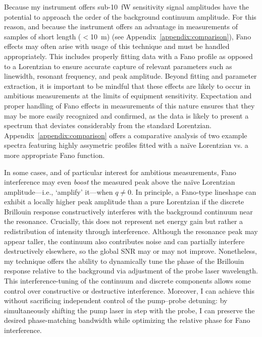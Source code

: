 Because my instrument offers sub-\SI{10}{\femto\watt} sensitivity signal amplitudes have the potential to approach the order of the background continuum amplitude. For this reason, and because the instrument offers an advantage in measurements of samples of short length (\(<\)\SI{10}{m}) (see Appendix~\ref{appendix:comparison}), Fano effects may often arise with usage of this technique and must be handled appropriately. This includes properly fitting data with a Fano profile as opposed to a Lorentzian to ensure accurate capture of relevant parameters such as linewidth, resonant frequency, and peak amplitude. Beyond fitting and parameter extraction, it is important to be mindful that these effects are likely to occur in ambitious measurements at the limits of equipment sensitivity. Expectation and proper handling of Fano effects in measurements of this nature ensures that they may be more easily recognized and confirmed, as the data is likely to present a spectrum that deviates considerably from the standard Lorentzian. Appendix~\ref{appendix:comparison} offers a comparative analysis of two example spectra featuring highly assymetric profiles fitted with a naïve Lorentzian vs. a more appropriate Fano function.

In some cases, and of particular interest for ambitious measurements, Fano interference may even \textit{boost} the measured peak above the naïve Lorentzian amplitude—i.e., ‘amplify’ it—when \(q \neq 0\). In principle, a Fano‐type lineshape can exhibit a locally higher peak amplitude than a pure Lorentzian if the discrete Brillouin response constructively interferes with the background continuum near the resonance. Crucially, this does not represent net energy gain but rather a redistribution of intensity through interference. Although the resonance peak may appear taller, the continuum also contributes noise and can partially interfere destructively elsewhere, so the global \ac{SNR} may or may not improve. Nonetheless, my technique offers the ability to dynamically tune the phase of the Brillouin response relative to the background via adjustment of the probe laser wavelength. This interference-tuning of the continuum and discrete components allows some control over constructive or destructive interference. Moreover, I can achieve this without sacrificing independent control of the pump–probe detuning: by simultaneously shifting the pump laser in step with the probe, I can preserve the desired phase‐matching bandwidth while optimizing the relative phase for Fano interference.

